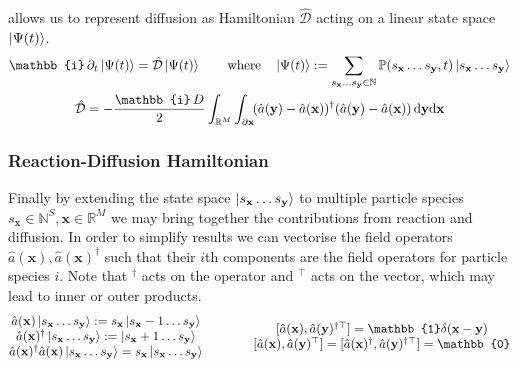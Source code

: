 \documentclass{article}[12pt]
\numberwithin{equation}{section}
\begin{document}
allows us to represent diffusion as Hamiltonian $\hat{\mathcal{D}}$ acting on a linear
state space $\ket{\Psi(t)}$.
\begin{align}
	\mathbb{i}\,\partial_t\ket{\Psi(t)}
	=\hat{\mathcal{D}}\ket{\Psi(t)}
	\qquad\text{where}\quad
	\ket{\Psi(t)}:=\sum_{s_{\mathbf{x}}\dots s_{\mathbf{y}}\in\mathbb{N}}
	\mathbb{P}(s_{\mathbf{x}}\dots s_{\mathbf{y}},t)
	\ket{s_{\mathbf{x}}\dots s_{\mathbf{y}}}
	\label{eq:diffusionschrodinger}
\\
	\hat{\mathcal{D}} = -\frac{\mathbb{i}\,D}{2}
	\int_{\mathbb{R}^{M}}\int_{\partial\mathbf{x}}\!
		(\hat{a}(\mathbf{y})-\hat{a}(\mathbf{x}))^{\dagger}(\hat{a}(\mathbf{y})-\hat{a}(\mathbf{x}))
	\,\mathrm{d}\mathbf{y}\mathrm{d}\mathbf{x}
	\qquad\qquad\quad
	\label{eq:diffusionhamiltonian}
\end{align}
\pagebreak
\subsubsection{Reaction-Diffusion Hamiltonian}\vspace{-10pt}
Finally by extending the state space $\ket{s_\mathbf{x}\dots s_\mathbf{y}}$ to multiple particle
species $s_\mathbf{x}\in\mathbb{N}^S,\mathbf{x}\in\mathbb{R}^M$ we may bring together the contributions
from reaction and diffusion. In order to simplify results we can vectorise the field operators
$\hat{a}(\mathbf{x}),\hat{a}(\mathbf{x})^{\dagger}$ such that their $i$th components are the field
operators for particle species $i$. Note that $^{\dagger}$ acts on the operator and $^\top$ acts on the
vector, which may lead to inner or outer products.
\begin{align}
	\begin{matrix}
		\hat{a}(\mathbf{x})\ket{s_\mathbf{x}\dots s_\mathbf{y}}
		:=s_\mathbf{x}\ket{s_\mathbf{x}-1\dots s_\mathbf{y}} \\
		\hat{a}(\mathbf{x})^{\dagger}\ket{s_\mathbf{x}\dots s_\mathbf{y}}
		:=\ket{s_\mathbf{x}+1\dots s_\mathbf{y}} \\
		\hat{a}(\mathbf{x})^{\dagger}
		\hat{a}(\mathbf{x})
		\ket{s_\mathbf{x}\dots s_\mathbf{y}}=s_\mathbf{x}\ket{s_\mathbf{x}\dots s_\mathbf{y}}
	\end{matrix}
	\qquad\qquad
	\begin{matrix}
		[		\hat{a}(\mathbf{x}),
				\hat{a}(\mathbf{y})^{\dagger\top} ]=\mathbb{1}\delta(\mathbf{x}-\mathbf{y}) \\
				[		\hat{a}(\mathbf{x}),
						\hat{a}(\mathbf{y})^{\top} ]=		[		\hat{a}(\mathbf{x})^{\dagger},
										\hat{a}(\mathbf{y})^{\dagger\top} ]=\mathbb{0}
	\end{matrix}
	\label{eq:vectorfieldoperators}
\end{align}
\end{document}
